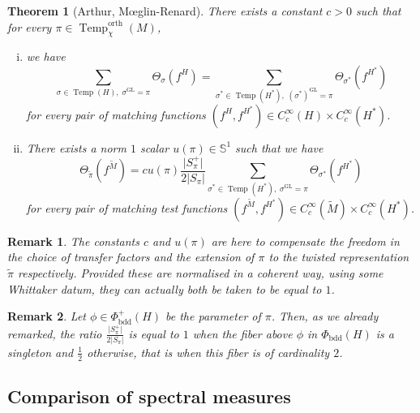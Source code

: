 \documentclass[12pt]{article}
\newtheorem{theo}{Theorem}[section]
\newtheorem{rem}{Remark}[section]
\numberwithin{equation}{section}
\def\tM{\widetilde{M}}
\DeclareMathOperator{\orth}{orth}
\DeclareMathOperator{\Temp}{Temp}
\DeclareMathOperator{\GL}{\mathrm{GL}}
\DeclareMathOperator{\bdd}{\mathrm{bdd}}
\begin{document}
	\begin{theo}[Arthur, M\oe{}glin-Renard]\label{theo twisted character relations}
		There exists a constant $c>0$ such that for every $\pi\in \Temp_\chi^{\orth}(M)$,
		\begin{enumerate}[(i)]
			\item we have
			\begin{equation}
				\displaystyle \sum_{\sigma\in \Temp(H), \; \sigma^{\GL}=\pi} \Theta_\sigma(f^H)=\sum_{\sigma^*\in \Temp(H^*),\; (\sigma^*)^{\GL}=\pi} \Theta_{\sigma^*}(f^{H^*})
			\end{equation}
			for every pair of matching functions $(f^H,f^{H^*})\in C_c^\infty(H)\times C_c^\infty(H^*)$.
			\item  There exists a norm $1$ scalar $u(\pi)\in \mathbb{S}^1$ such that we have
			\begin{equation}
				\displaystyle \Theta_{\widetilde{\pi}}(f^{\tM})=cu(\pi)\frac{\lvert S_\pi^+\rvert}{2\lvert S_\pi\rvert}\sum_{\sigma^*\in \Temp(H^*),\; \sigma^{\GL}=\pi} \Theta_{\sigma^*}(f^{H^*})
			\end{equation}
			for every pair of matching test functions $(f^{\tM},f^{H^*})\in C_c^\infty(\tM)\times C_c^\infty(H^*)$.
		\end{enumerate}	
		
		
	\end{theo}
	
	\begin{rem}
		The constants $c$ and $u(\pi)$ are here to compensate the freedom in the choice of transfer factors and the extension of $\pi$ to the twisted representation $\widetilde{\pi}$ respectively. Provided these are normalised in a coherent way, using some Whittaker datum, they can actually both be taken to be equal to $1$.
	\end{rem}
	
	\begin{rem}
		Let $\phi\in \Phi^+_{\bdd}(H)$ be the parameter of $\pi$. Then, as we already remarked, the ratio $\frac{\lvert S_\pi^+\rvert}{2\lvert S_\pi\rvert}$ is equal to $1$ when the fiber above $\phi$ in $\Phi_{\bdd}(H)$ is a singleton and $\frac{1}{2}$ otherwise, that is when this fiber is of cardinality $2$.
	\end{rem}
	
	\subsection{Comparison of spectral measures}
	
\end{document}

